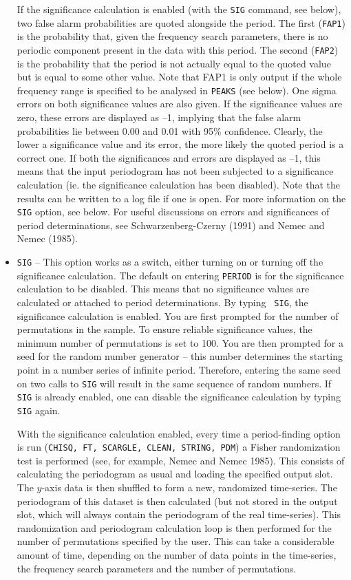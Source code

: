 \begin{itemize}
If the significance calculation is enabled (with the {\tt SIG} command, see
below), two false alarm probabilities are quoted alongside the period. The
first ({\tt FAP1}) is the probability that, given the frequency search
parameters, there is no periodic component present in the data with this
period. The second ({\tt FAP2}) is the probability that the period is not
actually equal to the quoted value but is equal to some other value. Note that
FAP1 is only output if the whole frequency range is specified to be analysed in
{\tt PEAKS} (see below). One sigma errors on both significance values are also
given. If the significance values are zero, these errors are displayed as --1,
implying that the false alarm probabilities lie between 0.00 and 0.01 with 95\%
confidence. Clearly, the lower a significance value and its error, the more
likely the quoted period is a correct one. If both the significances and errors
are displayed as --1, this means that the input periodogram has not been
subjected to a significance calculation (ie. the significance calculation has
been disabled). Note that the results can be written to a log file if one is
open. For more information on the {\tt SIG} option, see below. For useful
discussions on errors and significances of period determinations, see
Schwarzenberg-Czerny (1991) and Nemec and Nemec (1985).

\item {\tt SIG} -- This option works as a switch, either turning on or turning
off the significance calculation. The default on entering {\tt PERIOD} is for
the significance calculation to be disabled. This means that no significance
values are calculated or attached to period determinations. By typing {\tt
SIG}, the significance calculation is enabled. You are first prompted for the
number of permutations in the sample. To ensure reliable significance values,
the minimum number of permutations is set to 100. You are then prompted for a
seed for the random number generator -- this number determines the starting
point in a number series of infinite period. Therefore, entering the same seed
on two calls to {\tt SIG} will result in the same sequence of random numbers.
If {\tt SIG} is already enabled, one can disable the significance calculation
by typing {\tt SIG} again.

With the significance calculation enabled, every time a period-finding option
is run ({\tt CHISQ, FT, SCARGLE, CLEAN, STRING, PDM}) a Fisher randomization
test is performed (see, for example, Nemec and Nemec 1985). This consists of
calculating the periodogram as usual and loading the specified output slot. The
$y$-axis data is then shuffled to form a new, randomized time-series. The
periodogram of this dataset is then calculated (but not stored in the output
slot, which will always contain the periodogram of the real time-series). This
randomization and periodogram calculation loop is then performed for the number
of permutations specified by the user. This can take a considerable amount of
time, depending on the number of data points in the time-series, the frequency
search parameters and the number of permutations.


\end{itemize}
